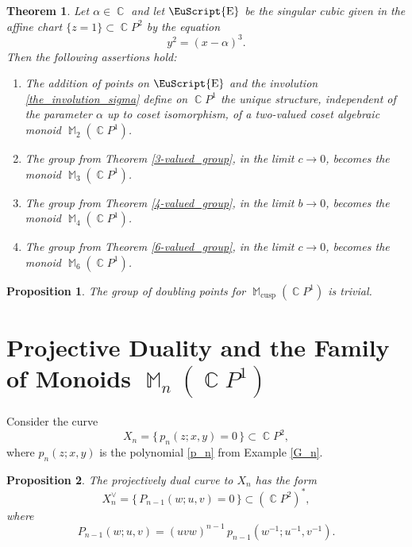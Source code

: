 \documentclass[14pt, dvipsnames]{extarticle}
\theoremstyle{plain}
\newtheorem{theorem}{Theorem}
\newtheorem{prop}{Proposition}
\theoremstyle{definition}
\theoremstyle{remark}
\DeclareMathOperator{\E}{\EuScript{E}}
\DeclareMathOperator{\Cc}{\mathbb{C}}
\DeclareMathOperator{\M}{\mathbb{M}}
\DeclareMathOperator{\cusp}{\mathrm{cusp}}
\begin{document}
\begin{theorem}\label{cusp_monoids}
Let $\alpha\in\Cc$ and let $\E$ be the singular cubic given in the affine chart $\{z = 1\}\subset\Cc\!P^2$ by the equation
$$y^2 = (x - \alpha)^3.$$
Then the following assertions hold:  
\begin{enumerate}[\bf (i)]
\item The addition of points on $\E$ and the involution \eqref{the_involution_sigma} define on $\Cc\!P^1$ the unique structure, independent of the parameter $\alpha$ up to {coset} isomorphism, of a two-valued coset algebraic monoid $\M_2(\Cc\!P^1)$. 

\item The group from Theorem {\normalfont\ref{3-valued_group}}, in the limit $c\to 0$, becomes the monoid $\M_3(\Cc\!P^1)$. 

\item The group from Theorem {\normalfont\ref{4-valued_group}}, in the limit $b\to 0$, becomes the monoid $\M_4(\Cc\!P^1)$. 

\item The group from Theorem {\normalfont\ref{6-valued_group}}, in the limit $c\to 0$, becomes the monoid $\M_6(\Cc\!P^1)$. 
\end{enumerate}
\end{theorem}

\begin{prop}
{The group of doubling points for $\M_{\cusp}(\Cc\!P^1)$ is trivial.}
\end{prop}








\section{Projective Duality and the Family of Monoids $\M_n(\Cc\!P^1)$}\label{projective_duality_and_the_family_of_monoids}

Consider the curve
\[
X_n=\{\,p_n(z; x, y)=0\,\}\subset \Cc\!P^2,
\]
where $p_n(z;x,y)$ is the polynomial \eqref{p_n} from Example \ref{G_n}.

\begin{prop}\label{prop_1}
The projectively dual curve to $X_n$ has the form
\[
X_n^\vee=\{\,P_{n-1}(w;u,v)=0\,\}\subset (\Cc\!P^2)^\ast,
\]
where
$$P_{n-1}(w;u,v)=(uvw)^{n-1}\,p_{n-1}(w^{-1};u^{-1},v^{-1}).$$
\end{prop}
\end{document}
